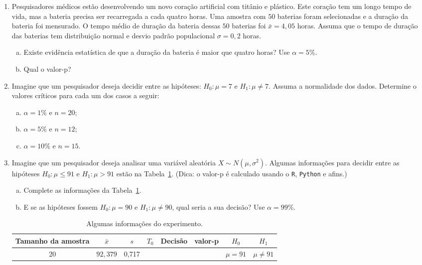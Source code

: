 \documentclass[12pt, a4paper]{article}
\begin{document}
\begin{enumerate}
	\item Pesquisadores médicos estão desenvolvendo um novo coração artificial com titânio e plástico. Este coração tem um longo tempo de vida, mas a bateria precisa ser recarregada a cada quatro horas. Uma amostra com $50$ baterias foram selecionadas e a duração da bateria foi mensurado. O tempo médio de duração da bateria dessas $50$ baterias foi $\bar{x} = 4,05$ horas. Assuma que o tempo de duração das baterias tem distribuição normal e desvio padrão populacional $\sigma=0,2$ horas. 
	\begin{enumerate}[(a)]
		\item Existe evidência estatística de que a duração da bateria é maior que quatro horas? Use $\alpha=5\%$.
		\item Qual o valor-p?
	\end{enumerate}

	\item Imagine que um pesquisador deseja decidir entre as hipóteses: $H_0: \mu = 7$ e $H_1: \mu \neq 7$. Assuma a normalidade dos dados. Determine o valores críticos para cada um dos casos a seguir:
	\begin{enumerate}[(a)]
		\item $\alpha=1\%$ e $n=20$;
		\item $\alpha=5\%$ e $n=12$;
		\item $\alpha=10\%$ e $n=15$.
	\end{enumerate}

	\item Imagine que um pesquisador deseja analisar uma variável aleatória $X \sim N(\mu, \sigma^2)$. Algumas informações para decidir entre as hipóteses $H_0: \mu \leq 91$ e $H_1: \mu > 91$ estão na Tabela~\ref{tab:s2-unknown-table}. (Dica: o valor-p é calculado usando o \texttt{R}, \texttt{Python} e afins.)
	\begin{enumerate}[(a)]
		\item Complete as informações da Tabela~\ref{tab:s2-unknown-table}.
		\item E se as hipóteses fossem $H_0:\mu = 90$ e $H_1: \mu \neq 90$, qual seria a sua decisão? Use $\alpha=99\%$.
	\end{enumerate}
	\begin{table}[htbp]
		\centering
		\begin{tabular}{c|c|c|c|c|c|c|c}
			\toprule[0.05cm]
			Tamanho da amostra & $\bar{x}$ & $s$ & $T_0$ & Decisão & valor-p & $H_0$ & $H_1$\\ \midrule[0.025cm]
			20 & $92,379$ & 0,717 & & & & $\mu = 91$ & $\mu \neq 91$\\
			\bottomrule[0.05cm]
		\end{tabular}
		\caption{Algumas informações do experimento.}
		\label{tab:s2-unknown-table}
	\end{table}


\end{enumerate}
\end{document}
